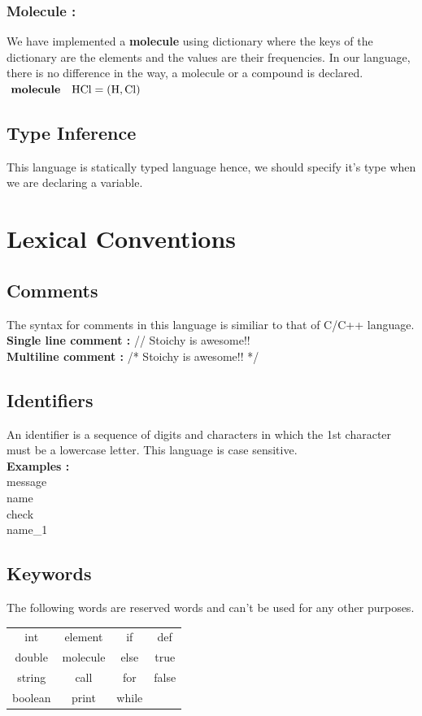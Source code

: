\documentclass[english,a4paper,12pt]{report}
\begin{document}
\subsubsection{Molecule : } We have implemented a \textbf{molecule} using dictionary where the keys of the dictionary are the elements and the values are their frequencies. In our language, there is no difference in the way, a molecule or a compound is declared.\\ 
$
\text{ \textbf{molecule}} \quad \mathrm{HCl}= (\mathrm{H},\mathrm{Cl})
$

\subsection{Type Inference}
This language is statically typed language hence, we should specify it's type when we are declaring a variable.
\section{Lexical Conventions}
\subsection{Comments}
The syntax for comments in this language is similiar to that of C/C++ language.\\
\textbf{Single line comment :} // Stoichy is awesome!!\\
\textbf{Multiline comment :} /* Stoichy is awesome!! */
    
\subsection{Identifiers}
    An identifier is a sequence of digits and characters in which the 1st character must be a lowercase letter. This language is case sensitive. \\
\textbf{Examples :}\\
message\\
name\\
check\\
name\_1\\
\subsection{Keywords}
The following words are reserved words and can't be used for any other purposes.
\begin{center}
    \begin{tabular}{ c c c c }
 int & element & if & def \\ 
 double & molecule & else & true \\
 string & call & for & false \\
 boolean & print & while & \\
\end{tabular}
\end{center}
\end{document}
